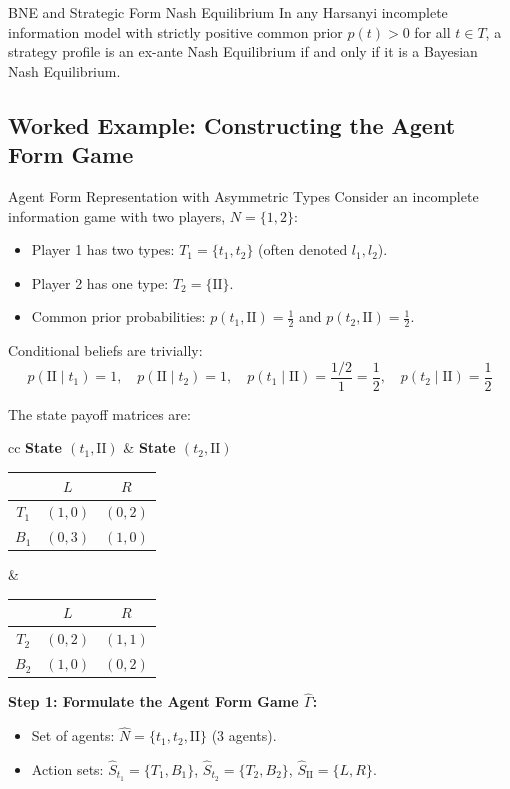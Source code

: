 \documentclass[12pt, a4paper]{article}
\begin{document}
\begin{thmbox}{BNE and Strategic Form Nash Equilibrium}
In any Harsanyi incomplete information model with strictly positive common prior $p(t) > 0$ for all $t \in T$, a strategy profile is an ex-ante Nash Equilibrium if and only if it is a Bayesian Nash Equilibrium.
\end{thmbox}

\subsection{Worked Example: Constructing the Agent Form Game}

\begin{exbox}{Agent Form Representation with Asymmetric Types}
Consider an incomplete information game with two players, $N = \{1, 2\}$:
\begin{itemize}
    \item Player 1 has two types: $T_1 = \{t_1, t_2\}$ (often denoted $l_1, l_2$).
    \item Player 2 has one type: $T_2 = \{\text{II}\}$.
    \item Common prior probabilities: $p(t_1, \text{II}) = \frac{1}{2}$ and $p(t_2, \text{II}) = \frac{1}{2}$.
\end{itemize}
Conditional beliefs are trivially:
\[
  p(\text{II} \mid t_1) = 1, \quad p(\text{II} \mid t_2) = 1, \quad p(t_1 \mid \text{II}) = \frac{1/2}{1} = \frac{1}{2}, \quad p(t_2 \mid \text{II}) = \frac{1}{2}
\]

The state payoff matrices are:
\begin{center}
\begin{tabular}{cc}
\textbf{State $(t_1, \text{II})$} & \textbf{State $(t_2, \text{II})$} \\[4pt]
\begin{tabular}{c|cc}
 & $L$ & $R$ \\ \hline
$T_1$ & $(1, 0)$ & $(0, 2)$ \\
$B_1$ & $(0, 3)$ & $(1, 0)$
\end{tabular}
&
\begin{tabular}{c|cc}
 & $L$ & $R$ \\ \hline
$T_2$ & $(0, 2)$ & $(1, 1)$ \\
$B_2$ & $(1, 0)$ & $(0, 2)$
\end{tabular}
\end{tabular}
\end{center}

\textbf{Step 1: Formulate the Agent Form Game $\hat{\Gamma}$:}
\begin{itemize}
    \item Set of agents: $\hat{N} = \{t_1, t_2, \text{II}\}$ (3 agents).
    \item Action sets: $\hat{S}_{t_1} = \{T_1, B_1\}$, $\hat{S}_{t_2} = \{T_2, B_2\}$, $\hat{S}_{\text{II}} = \{L, R\}$.
\end{itemize}


\end{exbox}
\end{document}
